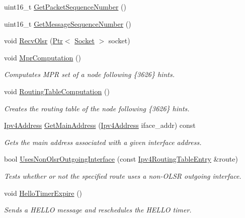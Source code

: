\begin{DoxyCompactItemize}
uint16\+\_\+t \hyperlink{classns3_1_1olsr_1_1RoutingProtocol_ab7cac75ba09d451d4cc12acb2030fbee}{Get\+Packet\+Sequence\+Number} ()
\item 
uint16\+\_\+t \hyperlink{classns3_1_1olsr_1_1RoutingProtocol_af8656b873ecc22d25d5e5795f936d61a}{Get\+Message\+Sequence\+Number} ()
\item 
void \hyperlink{classns3_1_1olsr_1_1RoutingProtocol_afa449e39488b5c03609960e66553490e}{Recv\+Olsr} (\hyperlink{classns3_1_1Ptr}{Ptr}$<$ \hyperlink{classns3_1_1Socket}{Socket} $>$ socket)
\item 
void \hyperlink{classns3_1_1olsr_1_1RoutingProtocol_a947ab35f39d191ed51d3fbb7c1cc282c}{Mpr\+Computation} ()
\begin{DoxyCompactList}\small\item\em Computates M\+PR set of a node following \{3626\} hints. \end{DoxyCompactList}\item 
void \hyperlink{classns3_1_1olsr_1_1RoutingProtocol_a69fcd3b690fbf6e2b46735145cecfe3e}{Routing\+Table\+Computation} ()
\begin{DoxyCompactList}\small\item\em Creates the routing table of the node following \{3626\} hints. \end{DoxyCompactList}\item 
\hyperlink{classns3_1_1Ipv4Address}{Ipv4\+Address} \hyperlink{classns3_1_1olsr_1_1RoutingProtocol_ae01451170fb389d322b33ed6d954f460}{Get\+Main\+Address} (\hyperlink{classns3_1_1Ipv4Address}{Ipv4\+Address} iface\+\_\+addr) const 
\begin{DoxyCompactList}\small\item\em Gets the main address associated with a given interface address. \end{DoxyCompactList}\item 
bool \hyperlink{classns3_1_1olsr_1_1RoutingProtocol_ae4f144aababb20e17a8cfc7c0823bb89}{Uses\+Non\+Olsr\+Outgoing\+Interface} (const \hyperlink{classns3_1_1Ipv4RoutingTableEntry}{Ipv4\+Routing\+Table\+Entry} \&route)
\begin{DoxyCompactList}\small\item\em Tests whether or not the specified route uses a non-\/\+O\+L\+SR outgoing interface. \end{DoxyCompactList}\item 
void \hyperlink{classns3_1_1olsr_1_1RoutingProtocol_a5f10703d9d0e82e48466ab69838c7b2b}{Hello\+Timer\+Expire} ()
\begin{DoxyCompactList}\small\item\em Sends a H\+E\+L\+LO message and reschedules the H\+E\+L\+LO timer. \end{DoxyCompactList}\item 

\end{DoxyCompactItemize}
